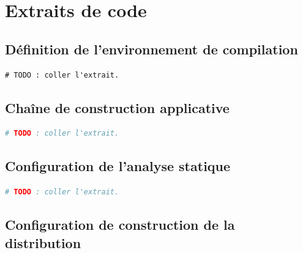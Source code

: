 \chapter{Extraits de code}
\label{ann:extraits-code}

\section{Définition de l'environnement de compilation}
\label{ann:dockerfile}


\begin{lstlisting}[language=docker,caption={Extrait de la définition de
  l'image de compilation}]
# TODO : coller l'extrait.
\end{lstlisting}

\section{Chaîne de construction applicative}
\label{ann:workflow-app}

\begin{lstlisting}[language=yaml,caption={Extrait de la chaîne de construction
  applicative : déclencheurs et matrice}]
# TODO : coller l'extrait.
\end{lstlisting}

\section{Configuration de l'analyse statique}
\label{ann:coverity}

\begin{lstlisting}[language=yaml,caption={Configuration des phases de capture,
  d'analyse et de remontée}]
# TODO : coller l'extrait.
\end{lstlisting}

\section{Configuration de construction de la distribution}
\label{ann:kas}

